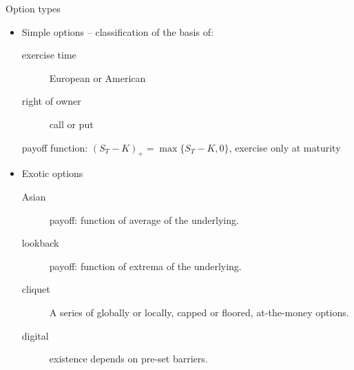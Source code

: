 \documentclass[utf8,t,compress,xcolor=svgnames,handout]{beamer}
\begin{document}
	
	\begin{frame}{Option types}
		\begin{itemize}
			\item Simple options -- classification of the basis of:
			\begin{description}
				\item[exercise time] European or American
				\item[right of owner] call or put
			\end{description}
			\begin{example}
				payoff function: $ (S_T - K)_+ = \max \{S_T - K, 0\} $, exercise only at maturity
			\end{example}
			\item Exotic options
			\begin{description}
				\item[\alert{Asian}] payoff: function of average of the underlying.
				\item[lookback] payoff: function of extrema of the underlying.
				\item[\alert{cliquet}] A series of globally or locally, capped or floored, at-the-money options.
				\item[digital] existence depends on pre-set barriers.
			\end{description}
		\end{itemize}
	\end{frame}
	
\end{document}
